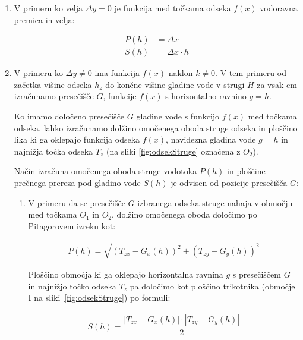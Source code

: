 \begin{enumerate}

\item V primeru ko velja $\Delta y = 0$ je funkcija med točkama odseka $f(x)$ vodoravna premica in velja:

\begin{ceqn}
\begin{align}
P(h)&= \Delta x\\
S(h)&= \Delta x \cdot h
\end{align}
\end{ceqn}


\item V primeru ko $\Delta y \neq 0$ ima funkcija $f(x)$ naklon $k \neq 0$. V tem primeru od začetka višine odseka $h_z$ do končne višine gladine vode v strugi $H$ za vsak cm izračunamo presečišče $G$, funkcije $f(x)$ s horizontalno ravnino $g = h$. 


Ko imamo določeno presečišče $G$ gladine vode s funkcijo $f(x)$ med točkama odseka, lahko izračunamo dolžino omočenega oboda struge odseka in ploščino lika ki ga oklepajo funkcija odseka $f(x)$, navidezna gladina vode $g = h$ in najnižja točka odseka $T_z$ (na sliki \ref{fig:odsekStruge} označena z $O_2$). 



Način izračuna omočenega oboda struge vodotoka $P(h)$ in ploščine prečnega prereza pod gladino vode $S(h)$ je odvisen od pozicije presečišča $G$:


\begin{enumerate}
	\item V primeru da se presečišče $G$ izbranega odseka struge nahaja v območju med točkama $O_1$ in $O_2$, dolžino omočenega oboda določimo po Pitagorovem izreku kot:
	
	\begin{ceqn}
		\begin{align}
		P(h) = \sqrt{(T_{zx} - G_x(h))^{2} + (T_{zy} - G_y(h))^{2}}
		\end{align}
	\end{ceqn}
	
	
	Ploščino območja ki ga oklepajo horizontalna ravnina $g$ s presečiščem $G$ in najnižjo točko odseka $T_z$ pa določimo kot ploščino trikotnika (območje I na sliki~\ref{fig:odsekStruge}) po formuli:
	
	\begin{ceqn}
		\begin{align}
		S(h) = \dfrac{|T_{zx} - G_x(h)| \cdot |T_{zy} - G_y(h)|}{2}
		\end{align}
	\end{ceqn}
	

\end{enumerate}
\end{enumerate}
